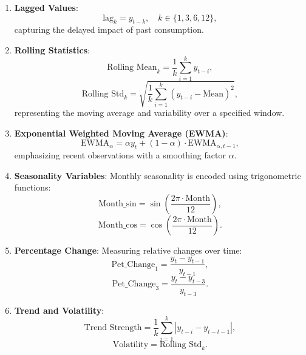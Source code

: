 \documentclass[journal]{IEEEtran}
\begin{document}
\begin{enumerate}
    \item \textbf{Lagged Values}:
    \begin{equation}
    \text{lag}_{k}=y_{t-k},\quad k\in\{1,3,6,12\},
    \end{equation}
    capturing the delayed impact of past consumption.

    \item \textbf{Rolling Statistics}:
    \begin{equation}
    \text{Rolling Mean}_{k}=\frac{1}{k}\sum_{i=1}^{k}y_{t-i},
    \end{equation}
    \begin{equation}
    \text{Rolling Std}_{k}=\sqrt{\frac{1}{k}\sum_{i=1}^{k}(y_{t-i}-\text{Mean})^{2}},
    \end{equation}
    representing the moving average and variability over a specified window.

    \item \textbf{Exponential Weighted Moving Average (EWMA)}:
    \begin{equation}
    \text{EWMA}_{\alpha}=\alpha y_{t}+(1-\alpha)\cdot\text{EWMA}_{\alpha,t-1},
    \end{equation}
    emphasizing recent observations with a smoothing factor \(\alpha\).

    \item \textbf{Seasonality Variables}: Monthly seasonality is encoded using trigonometric functions:
    \begin{equation}
    \text{Month\_sin}=\sin\left(\frac{2\pi\cdot\text{Month}}{12}\right),
    \end{equation}
    \begin{equation}
    \text{Month\_cos}=\cos\left(\frac{2\pi\cdot\text{Month}}{12}\right).
    \end{equation}

    \item \textbf{Percentage Change}: Measuring relative changes over time:
    \begin{equation}
    \text{Pet\_Change}_{1}=\frac{y_{t}-y_{t-1}}{y_{t-1}},
    \end{equation}
    \begin{equation}
    \text{Pet\_Change}_{3}=\frac{y_{t}-y_{t-3}}{y_{t-3}}.
    \end{equation}

    \item \textbf{Trend and Volatility}:
    \begin{equation}
    \text{Trend Strength}=\frac{1}{k}\sum_{i=1}^{k}|y_{t-i}-y_{t-t-1}|,
    \end{equation}
    \begin{equation}
    \text{Volatility}=\text{Rolling Std}_{k}.
    \end{equation}
\end{enumerate}
\end{document}
